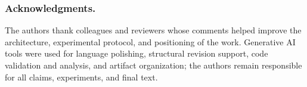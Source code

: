\documentclass[runningheads]{llncs}
\begin{document}
\subsubsection*{Acknowledgments.}
The authors thank colleagues and reviewers whose comments helped improve the architecture, experimental protocol, and positioning of the work. Generative AI tools were used for language polishing, structural revision support, code validation and analysis, and artifact organization; the authors remain responsible for all claims, experiments, and final text.



\end{document}

